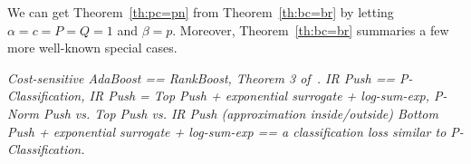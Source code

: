 We can get Theorem~\ref{th:pc=pn} from Theorem~\ref{th:bc=br} by letting $\alpha=c=P=Q=1$ and $\beta=p$.
Moreover, Theorem~\ref{th:bc=br} summaries a few more well-known special cases.

\TODO

{\it Cost-sensitive AdaBoost == RankBoost, Theorem 3 of~\cite{ertekin2011equivalence}.
IR Push == P-Classification,
IR Push = Top Push + exponential surrogate + log-sum-exp, P-Norm Push vs. Top Push vs. IR Push (approximation inside/outside)
Bottom Push + exponential surrogate + log-sum-exp == a classification loss similar to P-Classification.
}

\begin{table}[!h]
\centering
\caption{Summary of parameters for the equivalence of (risk of rank loss, risk of classification loss) pairs}
\label{tab:config}
\end{table}


